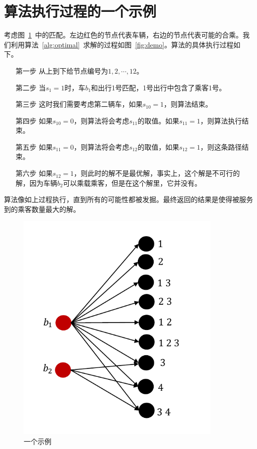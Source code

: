 \section{算法执行过程的一个示例}
考虑图~\ref{fig:demovtg}~中的匹配。左边红色的节点代表车辆，右边的节点代表可能的合乘。我们利用算法~\ref{alg:optimal}~求解的过程如图~\ref{fig:demo}。算法的具体执行过程如下。
\begin{itemize}
\item[第一步] 从上到下给节点编号为$1,2,\cdots,12$。
\item[第二步] 当$s_1=1$时，车$b_1$和出行1号匹配，1号出行中包含了乘客1号。
\item[第三步] 这时我们需要考虑第二辆车，如果$s_{10}=1$，则算法结束。
\item[第四步] 如果$s_{10}=0$，则算法将会考虑$s_{11}$的取值。如果$s_{11}=1$，则算法执行结束。
\item[第五步] 如果$s_{11}=0$，则算法将会考虑$s_{12}$的取值，如果$s_{12}=1$，则这条路径结束。
\item[第六步] 如果$s_{12}=1$，则此时的解不是最优解，事实上，这个解是不可行的解，因为车辆$b_2$可以乘载乘客，但是在这个解里，它并没有。
\end{itemize}
\par
算法像如上过程执行，直到所有的可能性都被发掘。最终返回的结果是使得被服务到的乘客数量最大的解。

\begin{figure}
\centering
\includegraphics[width=10cm]{./figures/img/VTG.pdf}
\caption{一个示例}
\label{fig:demovtg}
\end{figure}


